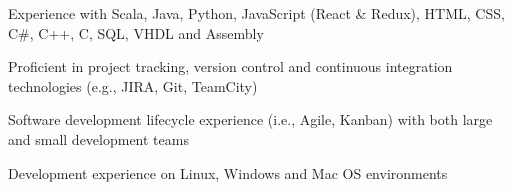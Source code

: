 \begin{cvitems}
\sectionspace
\sectionspace
\vspace{1mm}
	\fontsize{11pt}{1.4em}\bodyfontlight\upshape\color{text}
        \item {Experience with Scala, Java, Python, JavaScript (React \& Redux), HTML, CSS, C\#, C++, C, SQL, VHDL and Assembly}
        \item {Proficient in project tracking, version control and continuous integration technologies (e.g., JIRA, Git, TeamCity)}
        \item {Software development lifecycle experience (i.e., Agile, Kanban) with both large and small development teams}
        \item {Development experience on Linux, Windows and Mac OS environments}
        \end{cvitems}
\vspace{1mm}
\sectionspace
